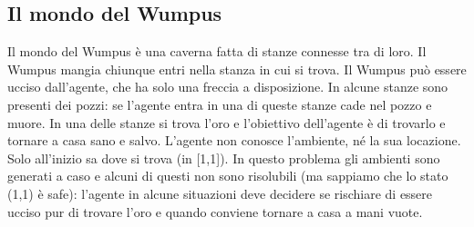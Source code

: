 \documentclass{article}
\begin{document}
\subsection{Il mondo del Wumpus}
Il mondo del Wumpus è una caverna fatta di stanze connesse tra di loro. Il Wumpus mangia chiunque entri nella stanza in cui si trova. Il Wumpus può essere ucciso dall’agente, che ha solo una freccia a disposizione. In alcune stanze sono presenti dei pozzi: se l'agente entra in una di queste stanze cade nel pozzo e muore. In una delle stanze si trova l’oro e l’obiettivo dell'agente è di trovarlo e tornare a casa sano e salvo. L’agente non conosce l’ambiente, né la sua locazione. Solo all'inizio sa dove si trova (in [1,1]). \newline
In questo problema gli ambienti sono generati a caso e alcuni di questi non sono risolubili (ma sappiamo che lo stato (1,1) è safe): l’agente in alcune situazioni deve decidere se rischiare di essere ucciso pur di trovare l’oro e quando conviene tornare a casa a mani vuote.
\end{document}
